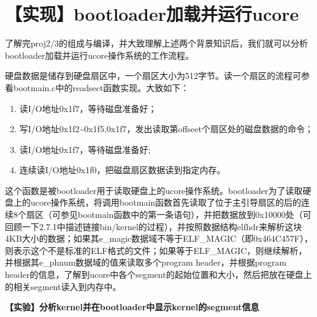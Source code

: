 \section{【实现】bootloader加载并运行ucore}\label{ux5b9eux73b0bootloaderux52a0ux8f7dux5e76ux8fd0ux884cucore}

了解完proj2/3的组成与编译，并大致理解上述两个背景知识后，我们就可以分析bootloader加载并运行ucore操作系统的工作流程。

硬盘数据是储存到硬盘扇区中，一个扇区大小为512字节。读一个扇区的流程可参看bootmain.c中的readsect函数实现。大致如下：

\begin{enumerate}
\def\labelenumi{\arabic{enumi}.}
\tightlist
\item
  读I/O地址0x1f7，等待磁盘准备好；
\item
  写I/O地址0x1f2\textasciitilde{}0x1f5,0x1f7，发出读取第offseet个扇区处的磁盘数据的命令；
\item
  读I/O地址0x1f7，等待磁盘准备好;
\item
  连续读I/O地址0x1f0，把磁盘扇区数据读到指定内存。
\end{enumerate}

这个函数是被bootloader用于读取硬盘上的ucore操作系统。bootloader为了读取硬盘上的ucore操作系统，将调用bootmain函数首先读取了位于主引导扇区的后的连续8个扇区（可参见bootmain函数中的第一条语句），并把数据放到0x10000处（可回顾一下2.7.1中描述链接bin/kernel的过程），并按照数据结构elfhdr来解析这块4KB大小的数据；如果其e\_magic数据域不等于ELF\_MAGIC（即0x464C457F），则表示这个不是标准的ELF格式的文件；如果等于ELF\_MAGIC，则继续解析，并根据其e\_phnum数据域的值来读取多个program
header，并根据program
header的信息，了解到ucore中各个segment的起始位置和大小，然后把放在硬盘上的相关segment读入到内存中。

\textbf{【实验】分析kernel并在bootloader中显示kernel的segment信息}

